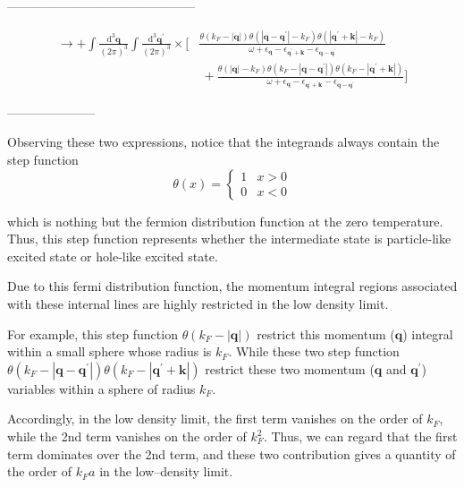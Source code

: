 \begin{center}---------------------------------------------\end{center}
\begin{equation} \label{Eqs2.7.2} \begin{split}
\rightarrow + \int \frac{\mathrm{d}^3 \mathbf{q}}{(2\pi)^3}\int \frac{\mathrm{d}^3 \mathbf{q}^{'}}{(2\pi)^3} \times [ &\frac{\theta(k_F-|\mathbf{q}|)\theta(|\mathbf{q}-\mathbf{q}^{'}|-k_F)\theta(|\mathbf{q}^{'}+\mathbf{k}|-k_F)}{\omega+\epsilon_{\mathbf{q}} - \epsilon_{\mathbf{q}^{'}+\mathbf{k}}-\epsilon_{\mathbf{q}-\mathbf{q}^{'}}} \\
& \ + \frac{\theta(|\mathbf{q}|-k_F)\theta(k_F-|\mathbf{q}-\mathbf{q}^{'}|)\theta(k_F-|\mathbf{q}^{'}+\mathbf{k}|)}{\omega+\epsilon_{\mathbf{q}} - \epsilon_{\mathbf{q}^{'}+\mathbf{k}}-\epsilon_{\mathbf{q}-\mathbf{q}^{'}}} ]
\end{split} \end{equation}

\begin{center}---------------------\end{center}

Observing these two expressions, notice that the integrands always contain the step function
\[ \theta(x) = \begin{cases} 1 & x > 0\\ 0 & x < 0 \end{cases} \]

which is nothing but the fermion distribution function at the zero temperature. Thus, this step function represents whether the intermediate state is particle-like excited state or hole-like excited state.

Due to this fermi distribution function, the momentum integral regions associated with these internal lines are highly restricted in the low density limit.

For example, this step function $\theta(k_F - |\mathbf{q}|)$ restrict this momentum ($\mathbf{q}$) integral within a small sphere whose radius is $k_F$. While these two step function $\theta(k_F-|\mathbf{q}-\mathbf{q}^{'}|)\theta(k_F-|\mathbf{q}^{'}+\mathbf{k}|)$ restrict these two momentum ($\mathbf{q}$ and $\mathbf{q}^{'}$) variables within a sphere of radius $k_F$.%

Accordingly, in the low density limit, the first term vanishes on the order of $k_F$, while the 2nd term vanishes on the order of $k_F^2$. Thus, we can regard that the first term dominates over the 2nd term, and these two contribution gives a quantity of the order of $k_F a$ in the low--density limit.


